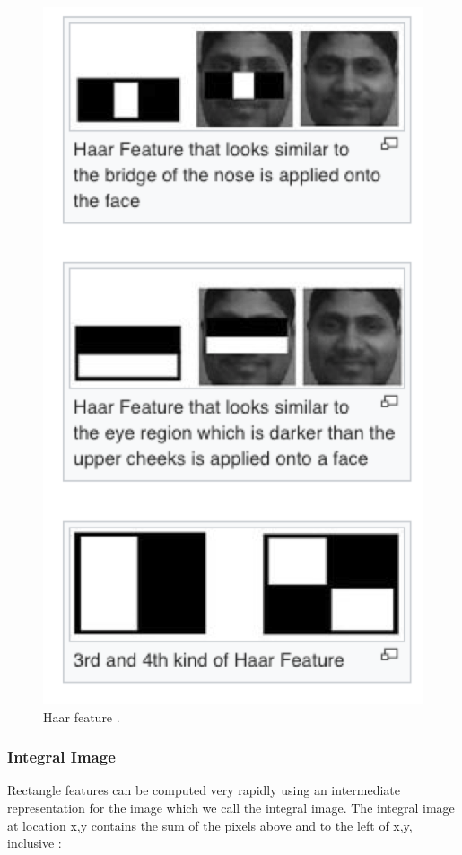 \documentclass[conference]{IEEEtran}
\begin{document}
\begin{figure}[htbp]
  \centerline{\includegraphics[scale=0.5]{./image/Haar_Feature.png}}
  \caption{Haar feature \cite{b1}.}
  \label{fig}
\end{figure}

\subsubsection{Integral Image}
Rectangle features can be computed very rapidly using an intermediate representation for the image which we call the integral image. The integral image at location x,y contains the sum of the pixels above and to the left of x,y, inclusive \cite{b2}:
\end{document}
